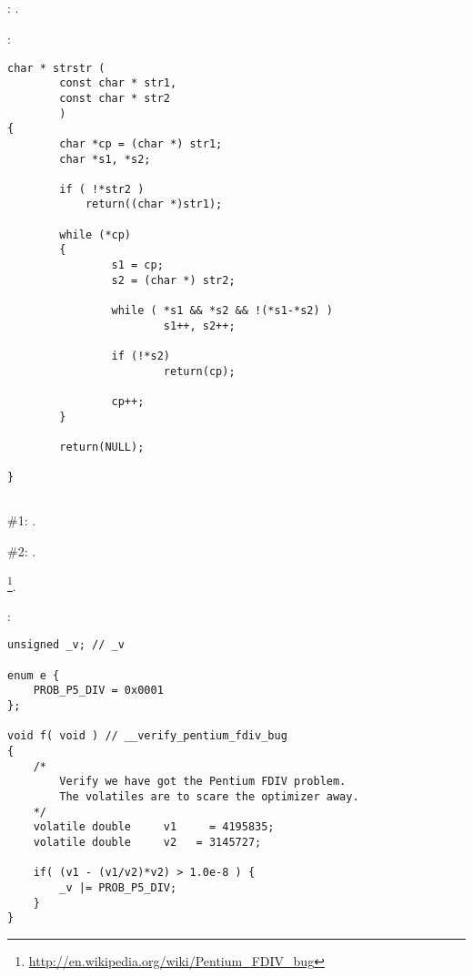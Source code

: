 \subsection{}

: .

:

\begin{lstlisting}
char * strstr (
        const char * str1,
        const char * str2
        )
{
        char *cp = (char *) str1;
        char *s1, *s2;

        if ( !*str2 )
            return((char *)str1);

        while (*cp)
        {
                s1 = cp;
                s2 = (char *) str2;

                while ( *s1 && *s2 && !(*s1-*s2) )
                        s1++, s2++;

                if (!*s2)
                        return(cp);

                cp++;
        }

        return(NULL);

}
\end{lstlisting}

\subsection{}

 \#1:  
\EMDASH{}.

 \#2: 
.

\footnote{\url{http://en.wikipedia.org/wiki/Pentium_FDIV_bug}}.

:

\begin{lstlisting}
unsigned _v; // _v

enum e {
    PROB_P5_DIV = 0x0001
};

void f( void ) // __verify_pentium_fdiv_bug
{
    /*
        Verify we have got the Pentium FDIV problem.
        The volatiles are to scare the optimizer away.
    */
    volatile double     v1     = 4195835;
    volatile double     v2   = 3145727;

    if( (v1 - (v1/v2)*v2) > 1.0e-8 ) {
        _v |= PROB_P5_DIV;
    }
}
\end{lstlisting}

